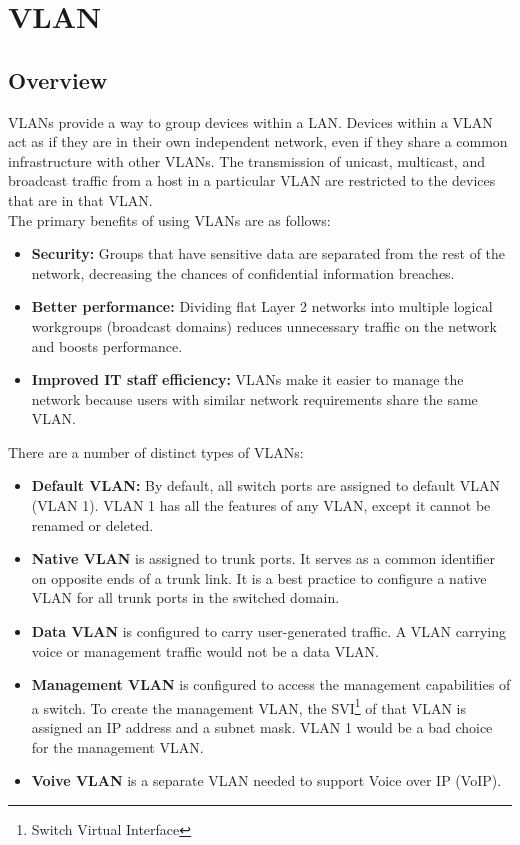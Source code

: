 \chapter{VLAN}

\section{Overview}

VLANs provide a way to group devices within a LAN. Devices within a VLAN act as if they are in their own independent network, even if they share a common infrastructure with other VLANs. The transmission of unicast, multicast, and broadcast traffic from a host in a particular VLAN are restricted to the devices that are in that VLAN.\\

The primary benefits of using VLANs are as follows:

\begin{itemize}
\item \textbf{Security:} Groups that have sensitive data are separated from the rest of the network, decreasing the chances of confidential information breaches. 

\item \textbf{Better performance:} Dividing flat Layer 2 networks into multiple logical workgroups (broadcast domains) reduces unnecessary traffic on the network and
boosts performance.

\item \textbf{Improved IT staff efficiency:} VLANs make it easier to manage the network because users with similar network requirements share the same VLAN. 
\end{itemize}

There are a number of distinct types of VLANs: 

\begin{itemize}
\item \textbf{Default VLAN:} By default, all switch ports are assigned to default VLAN (VLAN 1). VLAN 1 has all the features of any VLAN, except it cannot be renamed or deleted.

\item \textbf{Native VLAN} is assigned to trunk ports. It serves as a common identifier on opposite ends of a trunk link. It is a best practice to configure a native VLAN for all trunk ports in the switched domain.

\item \textbf{Data VLAN} is configured to carry user-generated traffic. A VLAN carrying voice or management traffic would not be a data VLAN. 

\item \textbf{Management VLAN} is configured to access the management capabilities of a switch. To create the management VLAN, the SVI\footnote{Switch Virtual Interface} of that VLAN is assigned an IP address and a subnet mask. VLAN 1 would be a bad choice for the management VLAN.

\item \textbf{Voive VLAN} is a separate VLAN needed to support Voice over IP (VoIP). 
\end{itemize}

